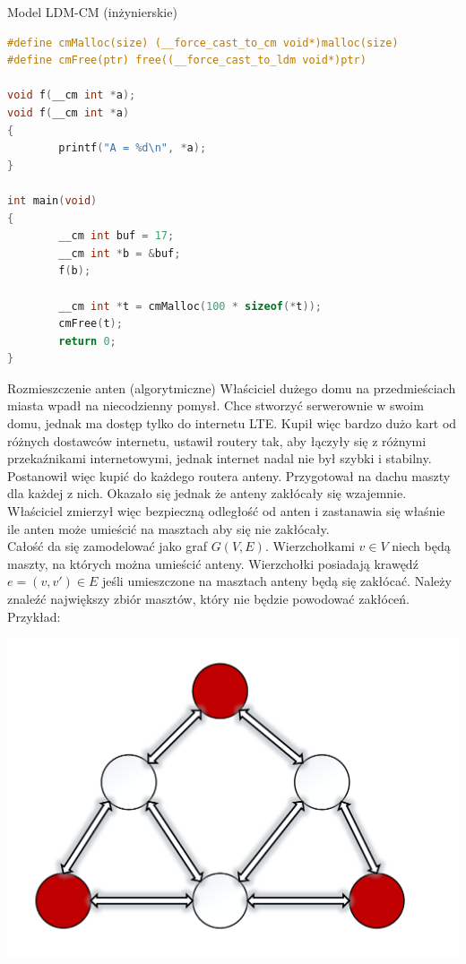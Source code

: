 \begin{exercise}{Model LDM-CM (inżynierskie)}{}
\begin{lstlisting}[language=C,style=C99]
#define cmMalloc(size) (__force_cast_to_cm void*)malloc(size)
#define cmFree(ptr) free((__force_cast_to_ldm void*)ptr)

void f(__cm int *a);
void f(__cm int *a)
{
        printf("A = %d\n", *a);
}

int main(void)
{
        __cm int buf = 17;
        __cm int *b = &buf;
        f(b);

        __cm int *t = cmMalloc(100 * sizeof(*t));
        cmFree(t);
        return 0;
}


\end{lstlisting}

\end{exercise}

\clearpage

\begin{exercise}{Rozmieszczenie anten (algorytmiczne)}{}
Właściciel dużego domu na przedmieściach miasta wpadł na niecodzienny pomysł. Chce stworzyć serwerownie w swoim domu, jednak ma dostęp tylko do internetu LTE. Kupił więc bardzo dużo kart od różnych dostawców internetu, ustawił routery tak, aby łączyły się z różnymi przekaźnikami internetowymi, jednak internet nadal nie był szybki i stabilny. Postanowił więc kupić do każdego routera anteny. Przygotował na dachu maszty dla każdej z nich. Okazało się jednak że anteny zakłócały się wzajemnie. Właściciel zmierzył więc bezpieczną odległość od anten i zastanawia się właśnie ile anten może umieścić na masztach aby się nie zakłócały. \\

Całość da się zamodelować jako graf $G(V, E)$. Wierzchołkami $v\in V$ niech będą maszty, na których można umieścić anteny. Wierzchołki posiadają krawędź $e=(v,v') \in E$ jeśli umieszczone na masztach anteny będą się zakłócać. Należy znaleźć największy zbiór masztów, który nie będzie powodować zakłóceń. \\
Przykład:

\begin{center}
\includegraphics[scale=0.3]{Rysunki/zad4.pdf}
\end{center}


\end{exercise}
